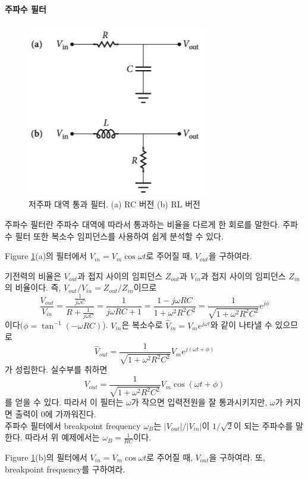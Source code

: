 \paragraph{주파수 필터}
\begin{figure}[h]
\centering\includegraphics[scale=0.8]{Pictures/freqfilter.PNG}
\caption{저주파 대역 통과 필터. (a) RC 버전 (b) RL 버전}
\label{fig:freqfilter}
\end{figure}
주파수 필터란 주파수 대역에 따라서 통과하는 비율을 다르게 한 회로를 말한다. 주파수 필터 또한 복소수 임피던스를 사용하여 쉽게 분석할 수 있다. 
\begin{example}[저주파 대역 통과 필터]
Figure \ref{fig:freqfilter}(a)의 필터에서 $V_{in}=V_m\cos\omega t$로 주어질 때,  $V_{out}$을 구하여라.
\end{example}
기전력의 비율은 $V_{out}$과 접지 사이의 임피던스 $Z_{out}$과  $V_{in}$과 접지 사이의 임피던스 $Z_{in}$의 비율이다. 즉, $V_{out}/V_{in}=Z_{out}/Z_{in}$이므로 
\begin{equation}
\frac{V_{out}}{V_{in}}=\frac{\frac{1}{j\omega C}}{R+\frac{1}{j\omega C}}=\frac{1}{j\omega RC+1}=\frac{1-j\omega RC}{1+\omega^2 R^2 C^2}=\frac{1}{\sqrt{1+\omega^2 R^2C^2}} e^{j\phi}
\end{equation}
이다($\phi=\tan^{-1}(-\omega RC)$). $V_{in}$은 복소수로 $\hat{V}_{in}=V_me^{j\omega t}$와 같이 나타낼 수 있으므로
\begin{equation}
\hat{V}_{out}=\frac{1}{\sqrt{1+\omega^2 R^2C^2}}V_me^{j(\omega t+\phi)}
\end{equation}
가 성립한다. 실수부를 취하면
\begin{equation}
V_{out}=\frac{1}{\sqrt{1+\omega^2 R^2C^2}}V_m\cos(\omega t+\phi)
\end{equation}
를 얻을 수 있다. 따라서 이 필터는 $\omega$가 작으면 입력전원을 잘 통과시키지만, $\omega$가 커지면 출력이 0에 가까워진다. 
\\주파수 필터에서 breakpoint frequency $\omega_B$는 $|V_{out}|/|V_{in}|$이 $1/\sqrt{2}$이 되는 주파수를 말한다. 따라서 위 예제에서는 $\omega_B=\frac{1}{RC}$이다.
\begin{exercise}
Figure \ref{fig:freqfilter}(b)의 필터에서 $V_{in}=V_m\cos\omega t$로 주어질 때,  $V_{out}$을 구하여라. 또, breakpoint frequency를 구하여라.
\end{exercise}


